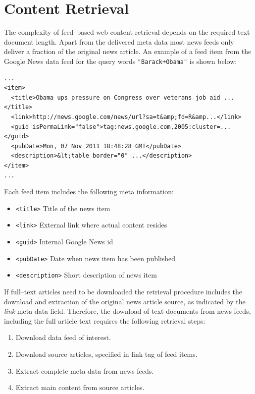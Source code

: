 \documentclass[a4paper]{article}
\newcommand{\code}[1]{\mbox{\texttt{#1}}}
\begin{document}
\newpage
\section{Content Retrieval}
The complexity of feed--based web content retrieval depends on the required text document
length. Apart from the delivered meta data most news feeds only deliver a fraction 
of the original news article. An example of a feed item from the Google News data
feed for the query words \code{"Barack+Obama"} is shown below:


\begin{lstlisting}
...
<item>
  <title>Obama ups pressure on Congress over veterans job aid ...</title>
  <link>http://news.google.com/news/url?sa=t&amp;fd=R&amp...</link>
  <guid isPermaLink="false">tag:news.google.com,2005:cluster=...</guid>
  <pubDate>Mon, 07 Nov 2011 18:48:28 GMT</pubDate>
  <description>&lt;table border="0" ...</description>
</item>
...
\end{lstlisting}

Each feed item includes the following meta information:
\begin{itemize}
  \item \code{<title>} Title of the news item
  \item \code{<link>} External link where actual content resides
  \item \code{<guid>} Internal Google News id
  \item \code{<pubDate>} Date when news item has been published
  \item \code{<description>} Short description of news item
\end{itemize} 

If full--text articles need to be downloaded the retrieval
procedure includes the download and extraction of the original news article
source, as indicated by the \textit{link} meta data field. Therefore, the 
download of text documents from news feeds, including the full article text
requires the following retrieval steps:
\begin{enumerate}
\item Download data feed of interest.
\item Download source articles, specified in link tag of feed items.
\item Extract complete meta data from news feeds.
\item Extract main content from source articles.
\end{enumerate}
\end{document}
